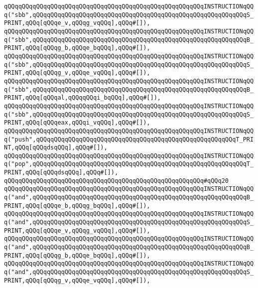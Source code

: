 \verb|qQQqqQQqqQQqqQQqqQQqqQQqqQQqqQQqqQQqqQQqqQQqqQQqqQQqqQQqINSTRUCTIONqQQq("sbb",qQQqqQQqqQQqqQQqqQQqqQQqqQQqqQQqqQQqqQQqqQQqqQQqqQQqqQQqqQQqS_PRINT,qQQq[qQQqe_v,qQQqg_vqQQq],qQQq#[]),|\newline
\verb|qQQqqQQqqQQqqQQqqQQqqQQqqQQqqQQqqQQqqQQqqQQqqQQqqQQqqQQqINSTRUCTIONqQQq("sbb",qQQqqQQqqQQqqQQqqQQqqQQqqQQqqQQqqQQqqQQqqQQqqQQqqQQqqQQqqQQqB_PRINT,qQQq[qQQqg_b,qQQqe_bqQQq],qQQq#[]),|\newline
\verb|qQQqqQQqqQQqqQQqqQQqqQQqqQQqqQQqqQQqqQQqqQQqqQQqqQQqqQQqINSTRUCTIONqQQq("sbb",qQQqqQQqqQQqqQQqqQQqqQQqqQQqqQQqqQQqqQQqqQQqqQQqqQQqqQQqqQQqS_PRINT,qQQq[qQQqg_v,qQQqe_vqQQq],qQQq#[]),|\newline
\verb|qQQqqQQqqQQqqQQqqQQqqQQqqQQqqQQqqQQqqQQqqQQqqQQqqQQqqQQqINSTRUCTIONqQQq("sbb",qQQqqQQqqQQqqQQqqQQqqQQqqQQqqQQqqQQqqQQqqQQqqQQqqQQqqQQqqQQqB_PRINT,qQQq[qQQqal,qQQqqQQqi_bqQQq],qQQq#[]),|\newline
\verb|qQQqqQQqqQQqqQQqqQQqqQQqqQQqqQQqqQQqqQQqqQQqqQQqqQQqqQQqINSTRUCTIONqQQq("sbb",qQQqqQQqqQQqqQQqqQQqqQQqqQQqqQQqqQQqqQQqqQQqqQQqqQQqqQQqqQQqS_PRINT,qQQq[qQQqeax,qQQqi_vqQQq],qQQq#[]),|\newline
\verb|qQQqqQQqqQQqqQQqqQQqqQQqqQQqqQQqqQQqqQQqqQQqqQQqqQQqqQQqINSTRUCTIONqQQq("push",qQQqqQQqqQQqqQQqqQQqqQQqqQQqqQQqqQQqqQQqqQQqqQQqqQQqqQQqT_PRINT,qQQq[qQQqdsqQQq],qQQq#[]),|\newline
\verb|qQQqqQQqqQQqqQQqqQQqqQQqqQQqqQQqqQQqqQQqqQQqqQQqqQQqqQQqINSTRUCTIONqQQq("pop",qQQqqQQqqQQqqQQqqQQqqQQqqQQqqQQqqQQqqQQqqQQqqQQqqQQqqQQqqQQqT_PRINT,qQQq[qQQqdsqQQq],qQQq#[]),|\newline
\verb|qQQqqQQqqQQqqQQqqQQqqQQqqQQqqQQqqQQqqQQqqQQqqQQqqQQqqQQq#qQQq20|\newline
\verb|qQQqqQQqqQQqqQQqqQQqqQQqqQQqqQQqqQQqqQQqqQQqqQQqqQQqqQQqINSTRUCTIONqQQq("and",qQQqqQQqqQQqqQQqqQQqqQQqqQQqqQQqqQQqqQQqqQQqqQQqqQQqqQQqqQQqB_PRINT,qQQq[qQQqe_b,qQQqg_bqQQq],qQQq#[]),|\newline
\verb|qQQqqQQqqQQqqQQqqQQqqQQqqQQqqQQqqQQqqQQqqQQqqQQqqQQqqQQqINSTRUCTIONqQQq("and",qQQqqQQqqQQqqQQqqQQqqQQqqQQqqQQqqQQqqQQqqQQqqQQqqQQqqQQqqQQqS_PRINT,qQQq[qQQqe_v,qQQqg_vqQQq],qQQq#[]),|\newline
\verb|qQQqqQQqqQQqqQQqqQQqqQQqqQQqqQQqqQQqqQQqqQQqqQQqqQQqqQQqINSTRUCTIONqQQq("and",qQQqqQQqqQQqqQQqqQQqqQQqqQQqqQQqqQQqqQQqqQQqqQQqqQQqqQQqqQQqB_PRINT,qQQq[qQQqg_b,qQQqe_bqQQq],qQQq#[]),|\newline
\verb|qQQqqQQqqQQqqQQqqQQqqQQqqQQqqQQqqQQqqQQqqQQqqQQqqQQqqQQqINSTRUCTIONqQQq("and",qQQqqQQqqQQqqQQqqQQqqQQqqQQqqQQqqQQqqQQqqQQqqQQqqQQqqQQqqQQqS_PRINT,qQQq[qQQqg_v,qQQqe_vqQQq],qQQq#[]),|\newline
